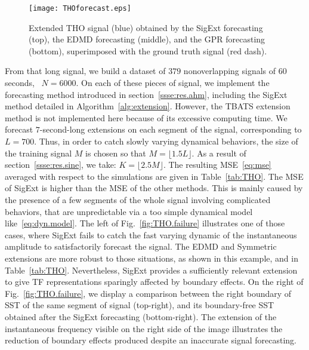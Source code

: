 \begin{figure}
\texttt{[image: THOforecast.eps]}
\caption{Extended THO signal (blue) obtained by the {\sf SigExt} forecasting (top), the EDMD forecasting (middle), and the GPR forecasting (bottom), superimposed with the ground truth signal (red dash).}
\label{fig:tho}
\end{figure}

From that long signal, we build a dataset of $379$ non\-overlapping signals of 60 seconds, \ie~$N=6000$. On each of these pieces of signal, we implement the forecasting method introduced in section~\ref{ssse:res.ahm}, including the {\sf SigExt} method detailed in Algorithm~\ref{alg:extension}. However, the TBATS extension method is not implemented here because of its excessive computing time. We forecast $7$-second-long extensions on each segment of the signal, corresponding to $L =700$. Thus, in order to catch slowly varying dynamical behaviors, the size of the training signal $M$ is chosen so that $M=\lfloor 1.5L\rfloor$. As a result of section~\ref{ssse:res.sine}, we take: $K=\lfloor2.5M\rfloor$. The resulting MSE~\eqref{eq:mse} averaged with respect to the simulations are given in Table~\ref{tab:THO}. The MSE of {\sf SigExt} is higher than the MSE of the other methods. This is mainly caused by the presence of a few segments of the whole signal involving complicated behaviors, that are unpredictable via a too simple dynamical model like~\eqref{eq:dyn.model}. The left of Fig.~\ref{fig:THO.failure} illustrates one of those cases, where {\sf SigExt} fails to catch the fast varying dynamic of the instantaneous amplitude to satisfactorily forecast the signal. The EDMD and Symmetric extensions are more robust to those situations, as shown in this example, and in Table~\ref{tab:THO}. Nevertheless, {\sf SigExt} provides a sufficiently relevant extension to give TF representations sparingly affected by boundary effects. On the right of Fig.~\ref{fig:THO.failure}, we display a comparison between the right boundary of SST of the same segment of signal (top-right), and its boundary-free SST obtained after the {\sf SigExt} forecasting (bottom-right). The extension of the instantaneous frequency visible on the right side of the image illustrates the reduction of boundary effects produced despite an inaccurate signal forecasting.

